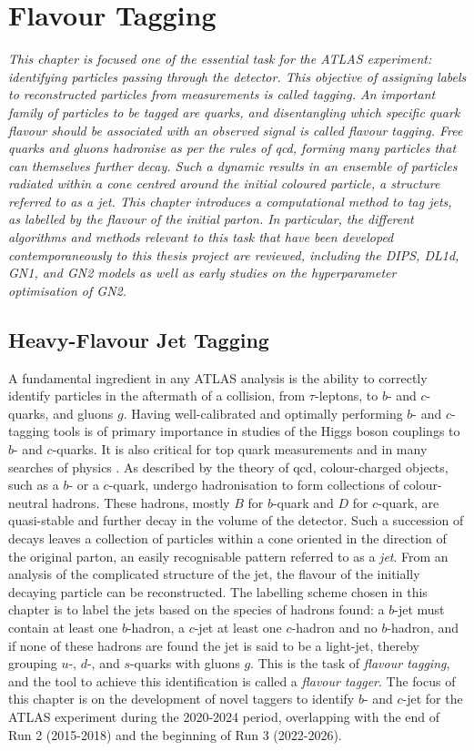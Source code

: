 \chapter{\color{oxfordblue} Flavour Tagging}\label{chap-ftag}
\ChapFrame

\textit{
This chapter is focused one of the essential task for the ATLAS experiment: identifying particles passing through the detector. This objective of assigning labels to reconstructed particles from measurements is called tagging. An important family of particles to be tagged are quarks, and disentangling which specific quark flavour should be associated with an observed signal is called flavour tagging. Free quarks and gluons hadronise as per the rules of \gls{qcd}, forming many particles that can themselves further decay. Such a dynamic results in an ensemble of particles radiated within a cone centred around the initial coloured particle, a structure referred to as a jet. This chapter introduces a computational method to tag jets, as labelled by the flavour of the initial parton. In particular, the different algorithms and methods relevant to this task that have been developed contemporaneously to this thesis project are reviewed, including the DIPS, DL1d, GN1, and GN2 models as well as early studies on the hyperparameter optimisation of GN2.
}

\section{Heavy-Flavour Jet Tagging}
A fundamental ingredient in any ATLAS analysis is the ability to correctly identify particles in the aftermath of a collision, from $\tau$-leptons, to $b$- and $c$-quarks, and gluons $g$. Having well-calibrated and optimally performing $b$- and $c$-tagging tools is of primary importance in studies of the Higgs boson couplings to $b$- and $c$-quarks. It is also critical for top quark measurements and in many searches of physics . As described by the theory of \gls{qcd}, colour-charged objects, such as a $b$- or a $c$-quark, undergo hadronisation to form collections of colour-neutral hadrons. These hadrons, mostly $B$ for $b$-quark and $D$ for $c$-quark, are quasi-stable and further decay in the volume of the detector. Such a succession of decays leaves a collection of particles within a cone oriented in the direction of the original parton, an easily recognisable pattern referred to as a \textit{jet}. From an analysis of the complicated structure of the jet, the flavour of the initially decaying particle can be reconstructed. The labelling scheme chosen in this chapter is to label the jets based on the species of hadrons found: a $b$-jet must contain at least one $b$-hadron, a $c$-jet at least one $c$-hadron and no $b$-hadron, and if none of these hadrons are found the jet is said to be a light-jet, thereby grouping $u$-, $d$-, and $s$-quarks with gluons $g$. This is the task of \textit{flavour tagging}, and the tool to achieve this identification is called a \textit{flavour tagger}. The focus of this chapter is on the development of novel taggers to identify $b$- and $c$-jet for the ATLAS experiment during the 2020-2024 period, overlapping with the end of Run 2 (2015-2018) and the beginning of Run 3 (2022-2026). 

